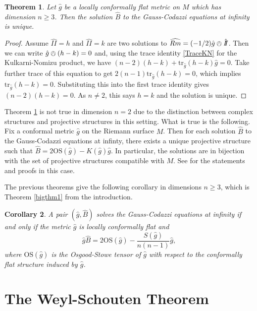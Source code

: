 \documentclass{amsart}
\newcommand{\two}{I\!\!I}
\newcommand{\tr}{\mathrm{tr}}
\newtheorem{thm}{Theorem}[section]
\newtheorem{cor}[thm]{Corollary}
\begin{document}
\begin{thm}
\label{Uniqueness}
Let $\hat{g}$ be a locally conformally flat metric on $M$ which has dimension $n \geq 3$.
Then the solution $\hat{B}$ to the Gauss-Codazzi equations at infinity is unique.
\end{thm}

\begin{proof}
Assume $\hat{\two} = h$ and $\hat{\two} = k$ are two solutions to $\widehat{Rm} = (-1/2)\hat{g}\owedge\hat{\two}$.
Then we can write $\hat{g}\owedge (h-k) = 0$ and, using the trace identity \eqref{TraceKN} for the Kulkarni-Nomizu product, we have $(n-2)(h-k) + \tr_{\hat{g}}(h-k)\hat{g} = 0$.
Take further trace of this equation to get $2(n-1)\tr_{\hat{g}}(h-k) = 0$, which implies $\tr_{\hat{g}}(h-k) = 0$.
Substituting this into the first trace identity gives $(n-2)(h-k) = 0$. 
As $n \neq 2$, this says $h=k$ and the solution is unique.
\end{proof}

Theorem \ref{Uniqueness} is not true in dimension $n = 2$ due to the distinction between complex structures and projective structures in this setting.
What is true is the following.
Fix a conformal metric $\hat{g}$ on the Riemann surface $M$.
Then for each solution $\hat{B}$ to the Gauss-Codazzi equations at infinty, there exists a unique projective structure such that $\hat{B} = 2\mathrm{OS}(\hat{g}) - K(\hat{g})\hat{g}$.
In particular, the solutions are in bijection with the set of projective structures compatible with $M$.
See \cite{Bridgeman-Bromberg2022} for the statements and proofs in this case. 



The previous theorems give the following corollary in dimensions $n \geq 3$, which is Theorem \ref{bigthm1} from the introduction. 
\begin{cor}
\label{MainThm}
A pair $(\hat{g},\hat{B})$ solves the Gauss-Codazzi equations at infinity if and only if the metric $\hat{g}$ is locally conformally flat and
\[
\hat{g} \hat{B} = 2\mathrm{OS}(\hat{g}) - \frac{S(\hat{g})}{n(n-1)}\hat{g},
\]
where $\mathrm{OS}(\hat{g})$ is the Osgood-Stowe tensor of $\hat{g}$ with respect to the conformally flat structure induced by $\hat{g}$.
\end{cor}


\section{The Weyl-Schouten Theorem}
\end{document}
